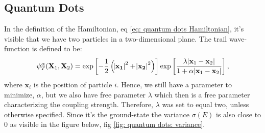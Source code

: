 \documentclass[a4paper]{article}
\newcommand{\average}[1]{\langle #1 \rangle}
\begin{document}
\subsection{Quantum Dots}
In the definition of the Hamiltonian, eq \eqref{eq: quantum dots Hamiltonian}, it's visible that we have two particles in a two-dimensional plane.
The trail wave-function is defined to be:
\begin{align*}
    \psi_T^{\alpha}(\mathbf{X}_1, \mathbf{X}_2) = \exp\left[-\frac{1}{2}\left(\abs{\mathbf{x_1}}^2 + \abs{\mathbf{x_2}}^2\right)\right]\exp\left[\frac{\lambda\abs{\mathbf{x}_1 - \mathbf{x}_2}}{1 + \alpha\abs{\mathbf{x}_1 - \mathbf{x}_2}}\right],
\end{align*}where $\mathbf{x}_i$ is the position of particle $i$.
Hence, we still have a parameter to minimize, $\alpha$, but we also have free parameter $\lambda$ which then is a free parameter characterizing the coupling strength.
Therefore, $\lambda$ was set to equal two, unless otherwise specified.
Since it's the ground-state the variance $\sigma(E)$ is also close to $0$ as visible in the figure below, fig \ref{fig: quantum dots: variance}.
\end{document}
